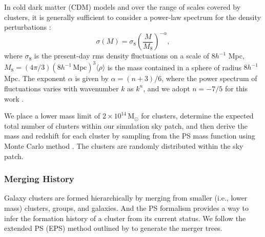 \documentclass[modern]{aastex61}
\newcommand{\Msun}{\mathrm{M}_{\odot}}
\begin{document}
In cold dark matter (CDM) models and over the range of scales covered
by clusters, it is generally sufficient to consider a power-law spectrum
for the density perturbations \citep{sarazin2002,randall2002}:
\begin{equation}
  \label{eq:sigma-mass}
  \sigma(M) = \sigma_8 \left( \frac{M}{M_8} \right)^{-\alpha},
\end{equation}
where $\sigma_8$ is the present-day rms density fluctuations on a
scale of $8 h^{-1}$ Mpc,
$M_8 = (4\pi/3)(8 h^{-1} \,\mathrm{Mpc})^3 \langle{\rho}\rangle$
is the mass contained in a sphere of radius $8 h^{-1}$ Mpc.
The exponent $\alpha$ is given by $\alpha = (n+3)/6$, where
the power spectrum of fluctuations varies with wavenumber $k$
as $k^n$, and we adopt $n = -7/5$ for this work \citep{randall2002}.

We place a lower mass limit of $2 \times 10^{14} \,\Msun$ for clusters,
determine the expected total number of clusters within our simulation
sky patch, and then derive the mass and redshift for each cluster by
sampling from the PS mass function using Monte Carlo method
\citep{wang2010}.
The clusters are randomly distributed within the sky patch.

\subsubsection{Merging History}
\label{sec:merging-history}

Galaxy clusters are formed hierarchically by merging from smaller (i.e.,
lower mass) clusters, groups, and galaxies.
And the PS formalism provides a way to infer the formation history
of a cluster from its current status.
We follow the extended PS (EPS) method outlined by \citet{lacey1993} to
generate the merger trees.
\end{document}
